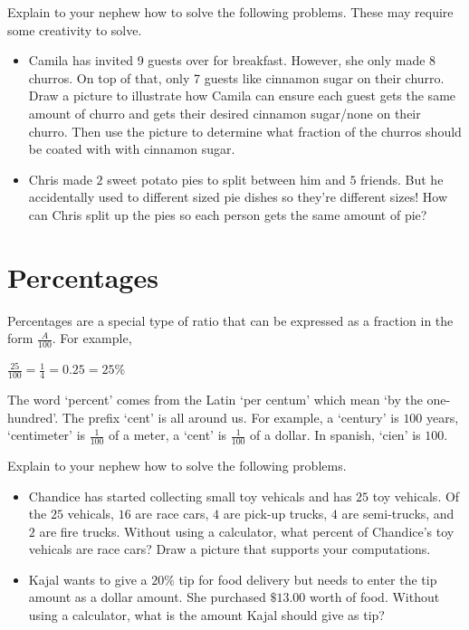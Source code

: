 \documentclass{ximera}
\begin{document}
\begin{exploration}
Explain to your nephew how to solve the following problems. These may require some creativity to solve.
\begin{itemize}
\item Camila has invited 9 guests over for breakfast. However, she only made 8 churros. On top of that, only 7 guests like cinnamon sugar on their churro.  Draw a picture to illustrate how Camila can ensure each guest gets the same amount of churro and gets their desired cinnamon sugar/none on their churro. Then use the picture to determine what fraction of the churros should be coated with with cinnamon sugar.
\item Chris made $2$ sweet potato pies to split between him and $5$ friends. But he accidentally used to different sized pie dishes so they're different sizes! How can Chris split up the pies so each person gets the same amount of pie?
\end{itemize}
\end{exploration}

\section{Percentages}
Percentages are a special type of ratio that can be expressed as a fraction in the form $\frac{A}{100}$.  For example,
\begin{center} $\frac{25}{100} = \frac{1}{4} =0.25=25\%$ \end{center}

The word `percent' comes from the Latin `per centum' which mean `by the one-hundred'. The prefix `cent' is all around us. For example, a `century' is $100$ years, `centimeter' is $\frac{1}{100}$ of a meter, a `cent' is $\frac{1}{100}$ of a dollar. In spanish, `cien' is $100$. \\



\begin{exploration}
Explain to your nephew how to solve the following problems.
\begin{itemize} 
\item Chandice has started collecting small toy vehicals and has $25$ toy vehicals. Of the $25$ vehicals, $16$ are race cars, $4$ are pick-up trucks, $4$ are semi-trucks, and $2$ are fire trucks.  Without using a calculator, what percent of Chandice's toy vehicals are race cars? Draw a picture that supports your computations.
\item Kajal wants to give a $20\%$ tip for food delivery but needs to enter the tip amount as a dollar amount. She purchased $\$13.00$ worth of food. Without using a calculator, what is the amount Kajal should give as tip?
\end{itemize}
\end{exploration} 
\end{document}
